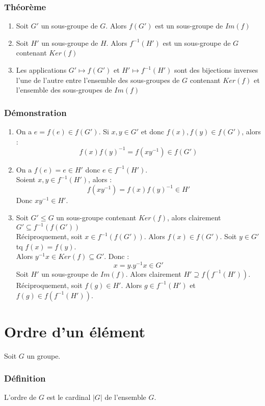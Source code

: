 \documentclass[a4paper, oneside]{report}
\begin{document}
\subsubsection{Théorème}
\begin{enumerate}
\item Soit $G'$ un sous-groupe de $G$. Alors $f(G')$ est un sous-groupe de $Im(f)$
\item Soit $H'$ un sous-groupe de $H$. Alors $f^{-1}(H')$ est un sous-groupe de $G$ contenant $Ker(f)$
\item Les applications $G'\mapsto f(G')$ et $H'\mapsto f^{-1}(H')$ sont des bijections inverses l'une de l'autre entre l'ensemble des sous-groupes de $G$ contenant $Ker(f)$ et l'ensemble des sous-groupes de $Im(f)$
\end{enumerate}

\subsubsection{Démonstration}
\begin{enumerate}
\item On a $e=f(e)\in f(G')$. Si $x,y\in G'$ et donc $f(x),f(y)\in f(G')$, alors :
$$f(x)f(y)^{-1}=f(xy^{-1})\in f(G')$$

\item On a $f(e)=e \in H'$ donc $e\in f^{-1}(H')$.\\
Soient $x,y\in f^{-1}(H')$, alors :
$$f(xy^{-1})=f(x)f(y)^{-1} \in H'$$
Donc $xy^{-1}\in H'$.

\item Soit $G'\leq G$ un sous-groupe contenant $Ker(f)$, alors clairement $G'\subseteq f^{-1}(f(G'))$\\
Réciproquement, soit $x\in f^{-1}(f(G'))$. Alors $f(x)\in f(G')$. Soit $y\in G'$ tq $f(x)=f(y)$.\\
Alors $y^{-1}x\in Ker(f)\subseteq G'$. Donc :
$$x = y.y^{-1}x \in G'$$
Soit $H'$ un sous-groupe de $Im(f)$. Alors clairement $H'\supseteq f(f^{-1}(H'))$.\\
Réciproquement, soit $f(g)\in H'$. Alors $g\in f^{-1}(H')$ et $f(g)\in f(f^{-1}(H'))$.
\end{enumerate}


\section{Ordre d'un élément}
Soit $G$ un groupe.\\

\subsubsection{Définition}
L'ordre de $G$ est le cardinal $|G|$ de l'ensemble $G$.
\end{document}
